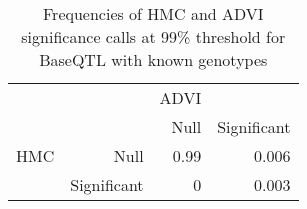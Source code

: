 \begin{table}[ht]
\centering
\caption{Frequencies of HMC and ADVI significance calls at 99\% threshold for BaseQTL with known genotypes} 
\label{tab:GT-xtab-prop-99}
\begin{tabular}{rr|rr}
   &  & ADVI &  \\ 
    &   & Null & Significant \\ 
   \hline
HMC & Null & 0.99 & 0.006 \\ 
    & Significant & 0 & 0.003 \\ 
  \end{tabular}
\end{table}
